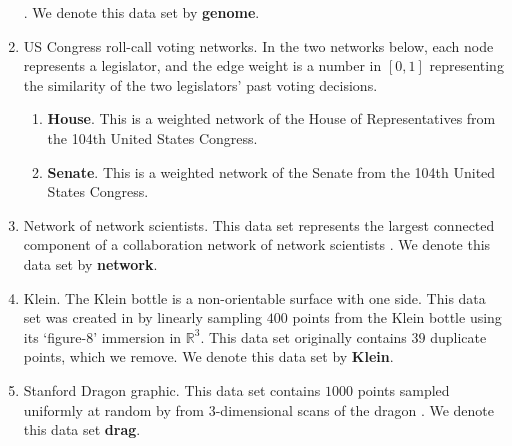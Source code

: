 \begin{enumerate}
    \DIFdelbegin {}\DIFdelend %
    \DIFaddbegin {}\DIFaddend . We denote this data set by \textbf{genome}.
    \item US Congress roll-call voting networks. In the two networks below, each node represents a legislator, and the edge weight is a number in $[0,1]$ representing the similarity of the two legislators' past voting decisions. \DIFaddbegin {}\DIFaddend \begin{enumerate}
        \item \textbf{House}. This is a weighted network of the House of Representatives from the 104th United States Congress.  
        \item \textbf{Senate}. This is a weighted network of the Senate from the 104th United States Congress.
    \end{enumerate}
    \item Network of network scientists. This data set represents the largest connected component of a collaboration network of network scientists \cite{newman2006finding}. \DIFaddbegin {}\DIFaddend We denote this data set by \textbf{network}. 
    \item Klein. The Klein bottle is a non-orientable surface with one side. This data set was created in \cite{roadmap2017} by linearly sampling $400$ points from the Klein bottle using its  `figure-8' immersion in $\mathbb{R}^3$. This data set originally contains $39$ duplicate points, which we remove. \DIFaddbegin {}\DIFaddend We denote this data set by \textbf{Klein}. 
    \item Stanford Dragon graphic. This data set contains $1000$ points sampled uniformly  at random by \cite{roadmap2017} from $3$-dimensional scans of the dragon \cite{drag}. \DIFaddbegin {}\DIFaddend We denote this data set \textbf{drag}. 
\end{enumerate}
\vspace{0.2cm}  
